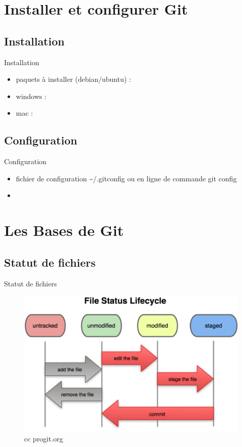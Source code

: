 \documentclass{beamer}
\begin{document}
\section{Installer et configurer Git}

\subsection*{Installation}
\begin{frame}{Installation}
  \begin{itemize}
    \item paquets à installer (debian/ubuntu) :
    \item windows :
    \item mac :
\end{itemize}




\end{frame}

\subsection*{Configuration}
\begin{frame}{Configuration}
  \begin{itemize}
    \item fichier de configuration \textasciitilde/.gitconfig ou en ligne de commande git config
    \item 
  \end{itemize}

\end{frame}

\section{Les Bases de Git}

\subsection*{Statut de fichiers}
\begin{frame}{Statut de fichiers}
\begin{figure}
\begin{center}
\includegraphics[scale=0.7]{Status_lifecycle.png}
\end{center}
\tiny
\caption{cc progit.org}
\label{cc progit.org}
\end{figure}
\end{frame}
\end{document}
